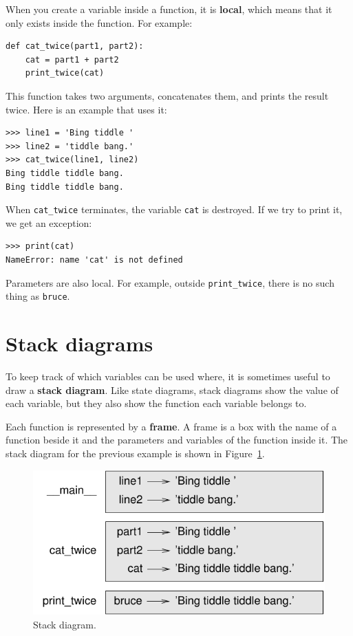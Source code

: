 When you create a variable inside a function, it is {\bf local},
which means that it only
exists inside the function.  For example:

\begin{lstlisting}
def cat_twice(part1, part2):
    cat = part1 + part2
    print_twice(cat)
\end{lstlisting}
%
This function takes two arguments, concatenates them, and prints
the result twice.  Here is an example that uses it:

\begin{lstlisting}
>>> line1 = 'Bing tiddle '
>>> line2 = 'tiddle bang.'
>>> cat_twice(line1, line2)
Bing tiddle tiddle bang.
Bing tiddle tiddle bang.
\end{lstlisting}
%
When \verb"cat_twice" terminates, the variable {\tt cat}
is destroyed.  If we try to print it, we get an exception:

\begin{lstlisting}
>>> print(cat)
NameError: name 'cat' is not defined
\end{lstlisting}
%
Parameters are also local.
For example, outside \verb"print_twice", there is no
such thing as {\tt bruce}.


%
\section{Stack diagrams}
\label{stackdiagram}

To keep track of which variables can be used where, it is sometimes
useful to draw a {\bf stack diagram}.  Like state diagrams, stack
diagrams show the value of each variable, but they also show the
function each variable belongs to.

Each function is represented by a {\bf frame}.  A frame is a box with
the name of a function beside it and the parameters and variables of
the function inside it.  The stack diagram for the previous example is
shown in Figure~\ref{fig.stack}.

\begin{figure}
\centerline
{\includegraphics[scale=0.8]{../source/figs/stack.pdf}}
\caption{Stack diagram.}
\label{fig.stack}
\end{figure}


